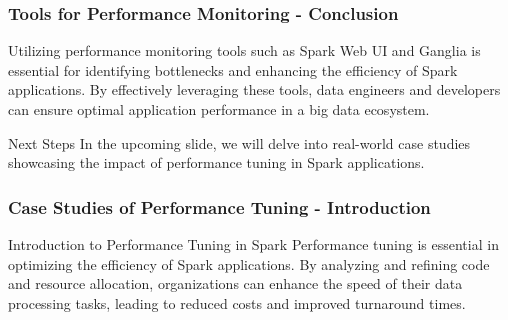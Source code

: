 \documentclass[aspectratio=169]{beamer}
\begin{document}
\begin{frame}[fragile]
    \frametitle{Tools for Performance Monitoring - Conclusion}
    Utilizing performance monitoring tools such as Spark Web UI and Ganglia is essential for identifying bottlenecks and enhancing the efficiency of Spark applications. By effectively leveraging these tools, data engineers and developers can ensure optimal application performance in a big data ecosystem.

    \begin{block}{Next Steps}
        In the upcoming slide, we will delve into real-world case studies showcasing the impact of performance tuning in Spark applications.
    \end{block}
\end{frame}

\begin{frame}[fragile]
    \frametitle{Case Studies of Performance Tuning - Introduction}
    \begin{block}{Introduction to Performance Tuning in Spark}
        Performance tuning is essential in optimizing the efficiency of Spark applications. By analyzing and refining code and resource allocation, organizations can enhance the speed of their data processing tasks, leading to reduced costs and improved turnaround times.
    \end{block}
\end{frame}
\end{document}
